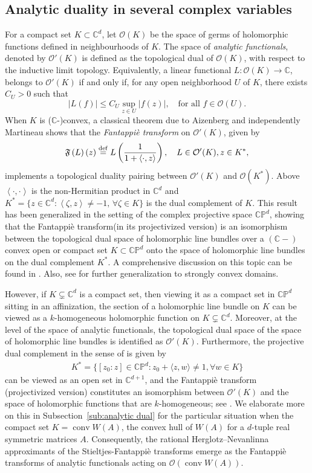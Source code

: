 \documentclass[11pt,reqno]{amsart}
\theoremstyle{plain}
\theoremstyle{definition}
\numberwithin{equation}{section}
\newcommand{\C}{\mathbb{C}}
\newcommand{\ltt}{\left(}
\newcommand{\rtt}{\right)}
\newcommand{\beas}{\begin{eqnarray*}}
\newcommand{\eeas}{\end{eqnarray*}}
\newcommand{\bea} {\begin{eqnarray}}
\newcommand{\eea} {\end{eqnarray}}
\newcommand{\bydef}{\stackrel{\rm def}{=}}
\begin{document}
\subsection{Analytic duality in several complex variables}
For a compact set $K\subset\C^d$, let $\mathcal O(K)$ be the space of germs of holomorphic functions defined in neighbourhoods of $K$. 
The space of {\em analytic functionals}, denoted by $\mathcal O'(K)$ is defined as the topological dual of $\mathcal O(K)$, with respect to the inductive limit topology. Equivalently, a linear functional $L : \mathcal O(K)\rightarrow\C$, belongs to $\mathcal O'(K)$ if and only if, for any open neighborhood $U$ of $K$, there exists $C_U>0$ such that
\[
|L(f)|\leq C_U \sup_{z\in U} |f(z)|,\quad \text{for all } f\in \mathcal O(U).
\]
 When $K$ is ($\C$-)convex, a classical theorem due to  Aizenberg and independently Martineau shows that the {\em Fantappi{\`e} transform} on $\mathcal O'(K)$, given by
\beas
\mathfrak{F}\ltt L \rtt(z) \bydef L \ltt\frac{1}{1+\left\langle\cdot,z\right\rangle}\rtt,\quad L \in\mathcal O'(K), z\in K^*,
\eeas
implements a topological duality pairing between ${\mathcal O}'(K)$ and ${\mathcal O}(K^\ast)$. Above
 $\left\langle\cdot,\cdot\right\rangle$ is the non-Hermitian product in $\C^d$ and $K^*=\{z\in\C^d:\left\langle\zeta,z\right\rangle\neq -1,\, \forall \zeta\in K\}$ is the dual complement of $K$. This result has been generalized in the setting of the complex projective space $\C\mathbb P^d$, showing that the Fantappi{\`e}  transform(in its projectivized version) is an isomorphism between the topological dual space of holomorphic line bundles over a $(\C-)$ convex open or compact set $K\subset\C\mathbb P^d$ onto the space of holomorphic line bundles on the dual complement $K^*$. A comprehensive discussion on this topic can be found in \cite{Andersson Passare book}. Also, see \cite{Chatterjee} for further generalization to strongly convex domains.
 
 However, if $K\subsetneq \C^d$ is a compact set, then viewing it as a compact set in $\C\mathbb P^d$ sitting in an affinization, the section of a holomorphic line bundle on $K$ can be viewed as a $k$-homogeneous holomorphic function on $K\subsetneq \C^d$. Moreover, at the level of the space of analytic functionals, the topological dual space of the space of holomorphic line bundles is identified as $\mathcal O'(K)$. Furthermore, the projective dual complement in the sense of \cite[Definition~2.1.1]{Andersson Passare book} is  given by 
 \bea\label{eq:projective dual}
 K^*=\{[z_0:z]\in \C\mathbb P^d: z_0+\langle z,w\rangle\neq 1, \forall w\in K\}
 \eea
can be viewed as an open set in $\C^{d+1}$, and the Fantappi{\`e} transform (projectivized version) constitutes an isomorphism between $\mathcal O'(K)$ and the space of holomorphic functions that are $k$-homogeneous; see \cite[Theorem~3.5.3]{Andersson Passare book}. We elaborate more on this in Subsection~\ref{sub:analytic dual} for the particular situation when the compact set
$K=\operatorname{conv} W(A)$, the convex hull of $W(A)$ for a $d$-tuple real symmetric matrices $A$.
Consequently, the rational Herglotz–Nevanlinna approximants of the Stieltjes-Fantappi{\`e} transforms emerge as the Fantappi\`e transforms of analytic functionals acting on $\mathcal{O}(\operatorname{conv} W(A))$.
\end{document}

